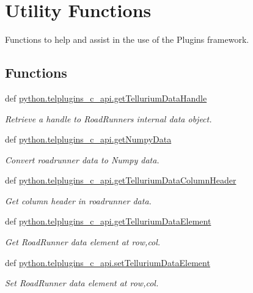 \hypertarget{group__utilities}{\section{Utility Functions}
\label{group__utilities}
}


Functions to help and assist in the use of the Plugins framework.  


\subsection*{Functions}
\begin{DoxyCompactItemize}
\item 
def \hyperlink{group__utilities_ga8e90dbd0ac30d9c8ea4d88bcc82fc95b}{python.\-telplugins\-\_\-c\-\_\-api.\-get\-Tellurium\-Data\-Handle}
\begin{DoxyCompactList}\small\item\em Retrieve a handle to Road\-Runners internal data object. \end{DoxyCompactList}\item 
def \hyperlink{group__utilities_ga638267ac0241e6a5976a1c2cb9c8b482}{python.\-telplugins\-\_\-c\-\_\-api.\-get\-Numpy\-Data}
\begin{DoxyCompactList}\small\item\em Convert roadrunner data to Numpy data. \end{DoxyCompactList}\item 
def \hyperlink{group__utilities_gad07a899a9a6a780c9d471f67fa9143d8}{python.\-telplugins\-\_\-c\-\_\-api.\-get\-Tellurium\-Data\-Column\-Header}
\begin{DoxyCompactList}\small\item\em Get column header in roadrunner data. \end{DoxyCompactList}\item 
def \hyperlink{group__utilities_ga0d750b1b8aa3490b32bb59f196379b4b}{python.\-telplugins\-\_\-c\-\_\-api.\-get\-Tellurium\-Data\-Element}
\begin{DoxyCompactList}\small\item\em Get Road\-Runner data element at row,col. \end{DoxyCompactList}\item 
def \hyperlink{group__utilities_ga78017e8add631fa4887d5afe03962a7b}{python.\-telplugins\-\_\-c\-\_\-api.\-set\-Tellurium\-Data\-Element}
\begin{DoxyCompactList}\small\item\em Set Road\-Runner data element at row,col. \end{DoxyCompactList}\item 

\end{DoxyCompactItemize}
